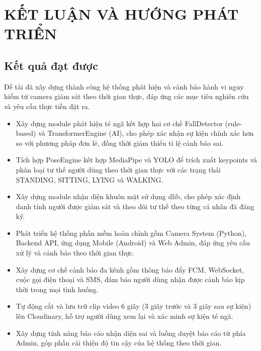 \chapter{KẾT LUẬN VÀ HƯỚNG PHÁT TRIỂN}

\section{Kết quả đạt được}

Đề tài đã xây dựng thành công hệ thống phát hiện và cảnh báo hành vi nguy hiểm
từ camera giám sát theo thời gian thực, đáp ứng các mục tiêu nghiên cứu và yêu
cầu thực tiễn đặt ra.

\begin{itemize}
    \item Xây dựng module phát hiện té ngã kết hợp hai cơ chế FallDetector
    (rule-based) và TransformerEngine (AI), cho phép xác nhận sự kiện chính xác
    hơn so với phương pháp đơn lẻ, đồng thời giảm thiểu tỉ lệ cảnh báo sai.

    \item Tích hợp PoseEngine kết hợp MediaPipe và YOLO để trích xuất keypoints
    và phân loại tư thế người dùng theo thời gian thực với các trạng thái
    STANDING, SITTING, LYING và WALKING.

    \item Xây dựng module nhận diện khuôn mặt sử dụng dlib, cho phép xác định
    danh tính người được giám sát và theo dõi tư thế theo từng cá nhân đã đăng ký.

    \item Phát triển hệ thống phần mềm hoàn chỉnh gồm Camera System (Python),
    Backend API, ứng dụng Mobile (Android) và Web Admin, đáp ứng yêu cầu xử lý
    và cảnh báo theo thời gian thực.

    \item Xây dựng cơ chế cảnh báo đa kênh gồm thông báo đẩy FCM, WebSocket,
    cuộc gọi điện thoại và SMS, đảm bảo người dùng nhận được cảnh báo kịp thời
    trong mọi tình huống.

    \item Tự động cắt và lưu trữ clip video 6 giây (3 giây trước và 3 giây sau
    sự kiện) lên Cloudinary, hỗ trợ người dùng xem lại và xác minh sự kiện té ngã.

    \item Xây dựng tính năng báo cáo nhận diện sai và luồng duyệt báo cáo từ
    phía Admin, góp phần cải thiện độ tin cậy của hệ thống theo thời gian.
\end{itemize}

